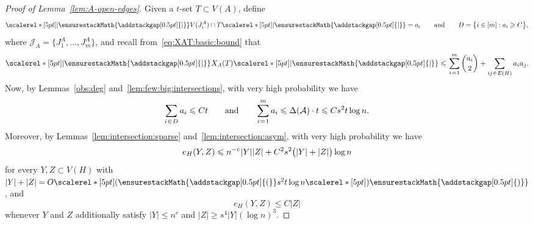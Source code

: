 \documentclass[12pt,reqno]{amsart}
\newcommand\pig[1]{\scalerel*[5pt]{\normalsize#1}{%
  \ensurestackMath{\addstackgap[0.5pt]{\normalsize#1}}}}
\theoremstyle{remark}
\numberwithin{theorem}{section}
\renewcommand{\(}{\bigl(}
\renewcommand{\)}{\bigr)\vphantom{)}}
\newcommand{\gap}{\hspace{0.02cm}}
\newcommand{\ina}{\hspace{0.02cm}\in\hspace{0.02cm}}
\newcommand{\eqa}{\hspace{0.02cm}=\hspace{0.015cm}}
\newcommand{\cA}{\mathcal A}
\newcommand{\cJ}{\mathcal J}
\renewcommand{\le}{\leqslant}
\renewcommand{\ge}{\geqslant}
\begin{document}
\begin{proof}[Proof of Lemma~\ref{lem:A-open-edges}]
Given a $t$-set $T \subset V(A)$, define 
\begin{equation}\label{def:ai:D} 
\pig| V(J^A_i) \cap T \pig| = a_i \qquad \text{and} \qquad D = \big\{ i \in [m] : a_i \ge C \big\},
\end{equation}
where $\cJ_A = \big\{ J^A_1, \ldots, J^A_m \big\}$, and recall from~\eqref{eq:XAT:basic:bound} that 
\begin{equation}\label{eq:XAT:basic:bound:again} 
\pig| \hspace{0.015cm} X_A(T) \pig| \le \hspace{0.03cm} \sum_{i \eqa 1}^m {a_i \choose 2} + \sum_{ij \ina E(H)} a_i a_j.
\end{equation}
Now, by Lemmas~\ref{obs:deg} and~\ref{lem:few:big:intersections}, with very high probability we have
\begin{equation}\label{eq:few:big:intersections:app}
\sum_{i \ina D} a_i \le Ct \qquad \text{and} \qquad \sum_{i \eqa 1}^m a_i \le \Delta(\cA) \cdot t \le C s^2 t \log n.
\end{equation}
Moreover, by Lemmas~\ref{lem:intersection:sparse} and~\ref{lem:intersection:asym}, with very high probability we have 
\begin{equation}\label{eq:intersection:again}
e_H(Y,Z) \le n^{-c} \gap |Y| |Z| + C^2 s^2 \big( |Y| + |Z| \big) \log n
\end{equation}
for every $Y,Z \subset V(H)$ with $|Y| + |Z| = O\pig( s^2 t \log n \pig)$, and  
\begin{equation}\label{eq:intersection:asym:again}
e_H(Y,Z) \le C |Z|
\end{equation}
whenever $Y$ and $Z$ additionally satisfy $|Y| \le n^c$ and $|Z| \ge s^4 |Y| (\log n)^3$. 


\end{proof}
\end{document}
